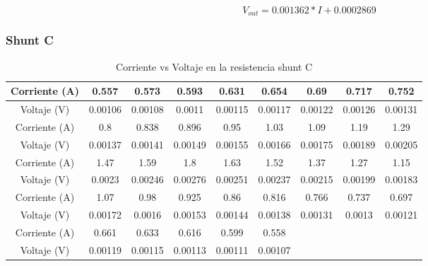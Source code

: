             \begin{equation}\label{crt ShuntB}
                V_{out} = 0.001362*I + 0.0002869 
            \end{equation}

        \subsubsection{Shunt C}

            \begin{table} [H]
                \begin{center}
                    \begin{tabular}{ |c|c|c|c|c|c|c|c|c| }
                        \hline
                        Corriente (A) & 0.557 & 0.573 & 0.593 & 0.631 & 0.654 & 0.69 & 0.717 & 0.752\\
                        \hline
                        Voltaje (V) & 0.00106 & 0.00108 & 0.0011 & 0.00115 & 0.00117 & 0.00122 & 0.00126 & 0.00131\\
                        \hline
                        \hline
                        Corriente (A) & 0.8 & 0.838 & 0.896 & 0.95 & 1.03 & 1.09 & 1.19 & 1.29\\
                        \hline
                        Voltaje (V) & 0.00137 & 0.00141 & 0.00149 & 0.00155 & 0.00166 & 0.00175 & 0.00189 & 0.00205\\
                        \hline
                        \hline
                        Corriente (A) & 1.47 & 1.59 & 1.8 & 1.63 & 1.52 & 1.37 & 1.27 & 1.15\\
                        \hline
                        Voltaje (V) & 0.0023 & 0.00246 & 0.00276 & 0.00251 & 0.00237 & 0.00215 & 0.00199 & 0.00183\\
                        \hline
                        \hline
                        Corriente (A) & 1.07 & 0.98 & 0.925 & 0.86 & 0.816 & 0.766 & 0.737 & 0.697\\
                        \hline
                        Voltaje (V) & 0.00172 & 0.0016 & 0.00153 & 0.00144 & 0.00138 & 0.00131 & 0.0013 & 0.00121\\
                        \hline
                        \hline
                        Corriente (A) & 0.661 & 0.633 & 0.616 & 0.599 & 0.558\\
                        \hline
                        Voltaje (V) & 0.00119 & 0.00115 & 0.00113 & 0.00111 & 0.00107\\
                        \hline
                    \end{tabular}
                \end{center}
                \caption{Corriente vs Voltaje en la resistencia shunt C}
                \label{tab:shuntC}
            \end{table}

